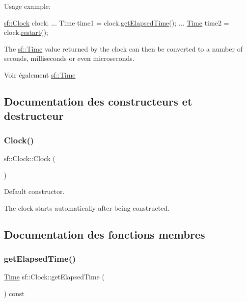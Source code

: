 Usage example\+: 
\begin{DoxyCode}
\hyperlink{classsf_1_1Clock}{sf::Clock} clock;
...
Time time1 = clock.\hyperlink{classsf_1_1Clock_abe889b42a65bcd8eefc16419645d08a7}{getElapsedTime}();
...
\hyperlink{classsf_1_1Time_acba0cfbc49e3a09a22a8e079eb67a05c}{Time} time2 = clock.\hyperlink{classsf_1_1Clock_a123e2627f2943e5ecaa1db0c7df3231b}{restart}();
\end{DoxyCode}


The \hyperlink{classsf_1_1Time}{sf\+::\+Time} value returned by the clock can then be converted to a number of seconds, milliseconds or even microseconds.

\begin{DoxySeeAlso}{Voir également}
\hyperlink{classsf_1_1Time}{sf\+::\+Time} 
\end{DoxySeeAlso}


\subsection{Documentation des constructeurs et destructeur}
\mbox{\label{classsf_1_1Clock_abbc959c7830ca7c3a4da133cb506d3fd}} 
\subsubsection{\texorpdfstring{Clock()}{Clock()}}
{\footnotesize\ttfamily sf\+::\+Clock\+::\+Clock (\begin{DoxyParamCaption}{ }\end{DoxyParamCaption})}



Default constructor. 

The clock starts automatically after being constructed. 

\subsection{Documentation des fonctions membres}
\mbox{\label{classsf_1_1Clock_abe889b42a65bcd8eefc16419645d08a7}} 
\subsubsection{\texorpdfstring{get\+Elapsed\+Time()}{getElapsedTime()}}
{\footnotesize\ttfamily \hyperlink{classsf_1_1Time}{Time} sf\+::\+Clock\+::get\+Elapsed\+Time (\begin{DoxyParamCaption}{ }\end{DoxyParamCaption}) const}



